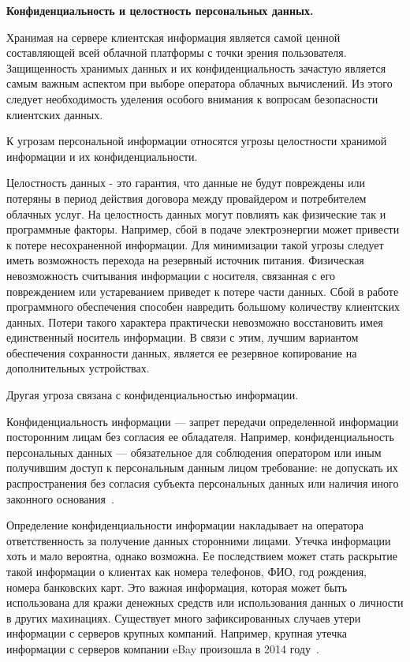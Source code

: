 \textbf{Конфиденциальность и целостность персональных данных.}

Хранимая на сервере клиентская информация является самой ценной составляющей  всей облачной платформы с точки зрения пользователя. Защищенность хранимых данных и их конфиденциальность зачастую является самым важным аспектом при выборе оператора облачных вычислений. Из этого следует необходимость уделения особого внимания к вопросам безопасности клиентских данных.

К угрозам персональной информации относятся угрозы целостности хранимой информации и их конфиденциальности.

Целостность данных - это гарантия, что данные не будут повреждены или потеряны в период действия договора между провайдером и потребителем облачных услуг. На целостность данных могут повлиять как физические так и программные факторы. Например, сбой в подаче электроэнергии может привести к потере несохраненной информации. Для минимизации такой угрозы следует иметь возможность перехода на резервный источник питания. Физическая невозможность считывания информации с носителя, связанная с его повреждением или устареванием приведет к потере части данных. Сбой в работе программного обеспечения способен навредить большому количеству клиентских данных. Потери такого характера практически невозможно восстановить имея единственный носитель информации. В связи с этим, лучшим вариантом обеспечения сохранности данных, является ее резервное копирование на дополнительных устройствах.

Другая угроза связана с конфиденциальностью информации.

Конфиденциальность информации — запрет передачи определенной информации посторонним  лицам без согласия ее обладателя. Например, конфиденциальность персональных данных — обязательное для соблюдения оператором или иным получившим доступ к персональным данным лицом требование: не допускать их распространения без согласия субъекта персональных данных или наличия иного законного основания~\cite{lopatnikovDict}.

Определение конфиденциальности информации накладывает на оператора ответственность за получение данных сторонними лицами. Утечка информации хоть и мало вероятна, однако возможна. Ее последствием может стать раскрытие такой информации о клиентах как номера телефонов, ФИО, год рождения, номера банковских карт. Это важная информация, которая может быть использована для кражи денежных средств или использования данных о личности в других махинациях. Существует много зафиксированных случаев утери информации с серверов крупных компаний. Например, крупная утечка информации с серверов компании eBay произошла в 2014 году~\cite{eBayPass}.

